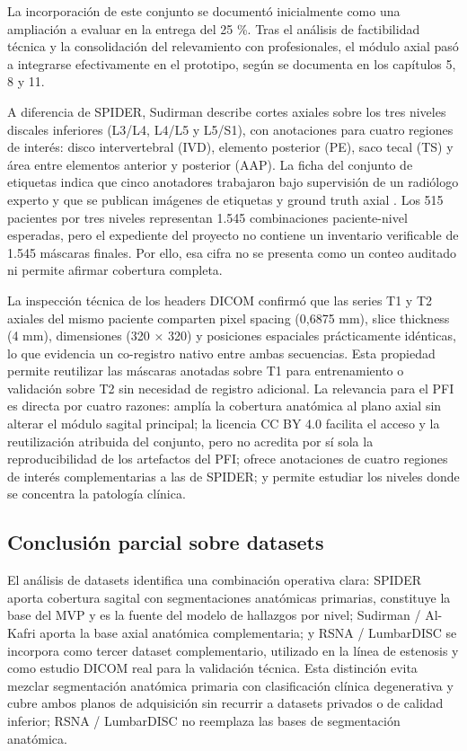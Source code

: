 La incorporación de este conjunto se documentó inicialmente como una ampliación a evaluar en la entrega del 25 \%. Tras el análisis de factibilidad técnica y la consolidación del relevamiento con profesionales, el módulo axial pasó a integrarse efectivamente en el prototipo, según se documenta en los capítulos 5, 8 y 11.

A diferencia de SPIDER, Sudirman describe cortes axiales sobre los tres niveles discales inferiores (L3/L4, L4/L5 y L5/S1), con anotaciones para cuatro regiones de interés: disco intervertebral (IVD), elemento posterior (PE), saco tecal (TS) y área entre elementos anterior y posterior (AAP). La ficha del conjunto de etiquetas indica que cinco anotadores trabajaron bajo supervisión de un radiólogo experto y que se publican imágenes de etiquetas y ground truth axial \parencite{alkafri_sudirman_boundary_2019}. Los 515 pacientes por tres niveles representan 1.545 combinaciones paciente-nivel esperadas, pero el expediente del proyecto no contiene un inventario verificable de 1.545 máscaras finales. Por ello, esa cifra no se presenta como un conteo auditado ni permite afirmar cobertura completa.

La inspección técnica de los headers DICOM confirmó que las series T1 y T2 axiales del mismo paciente comparten pixel spacing (0,6875 mm), slice thickness (4 mm), dimensiones (320 × 320) y posiciones espaciales prácticamente idénticas, lo que evidencia un co-registro nativo entre ambas secuencias. Esta propiedad permite reutilizar las máscaras anotadas sobre T1 para entrenamiento o validación sobre T2 sin necesidad de registro adicional. La relevancia para el PFI es directa por cuatro razones: amplía la cobertura anatómica al plano axial sin alterar el módulo sagital principal; la licencia CC BY 4.0 facilita el acceso y la reutilización atribuida del conjunto, pero no acredita por sí sola la reproducibilidad de los artefactos del PFI; ofrece anotaciones de cuatro regiones de interés complementarias a las de SPIDER; y permite estudiar los niveles donde se concentra la patología clínica.

\subsection{Conclusión parcial sobre datasets}

El análisis de datasets identifica una combinación operativa clara: SPIDER aporta cobertura sagital con segmentaciones anatómicas primarias, constituye la base del MVP y es la fuente del modelo de hallazgos por nivel; Sudirman / Al-Kafri aporta la base axial anatómica complementaria; y RSNA / LumbarDISC se incorpora como tercer dataset complementario, utilizado en la línea de estenosis y como estudio DICOM real para la validación técnica. Esta distinción evita mezclar segmentación anatómica primaria con clasificación clínica degenerativa y cubre ambos planos de adquisición sin recurrir a datasets privados o de calidad inferior; RSNA / LumbarDISC no reemplaza las bases de segmentación anatómica.

